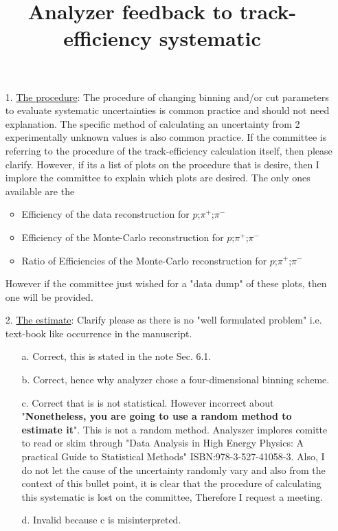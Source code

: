 \documentclass[10pt,a4paper]{report}
\author{}
\title{Analyzer feedback to track-efficiency systematic}
\date{}
\begin{document}
	\maketitle
\begin{itemize}
	\item[1.] \underline{The procedure}: The procedure of changing binning and/or cut parameters to evaluate systematic uncertainties is common practice and should not need explanation. The specific method of calculating an uncertainty from 2 experimentally unknown values is also common practice. If the committee is referring to the procedure of the track-efficiency calculation itself, then please clarify. However, if its a list of plots on the procedure that is desire, then I implore the committee to explain which plots are desired. The only ones available are the 
	\begin{itemize}
		\item Efficiency of the data reconstruction for $p$;$\pi^{+}$;$\pi^{-}$
		\item Efficiency of the Monte-Carlo reconstruction for $p$;$\pi^{+}$;$\pi^{-}$
		\item Ratio of Efficiencies of the Monte-Carlo reconstruction for $p$;$\pi^{+}$;$\pi^{-}$
	\end{itemize}
	However if the committee just wished for a "data dump" of these plots, then one will be provided.
	\item[2.] \underline{The estimate}: Clarify please as there is no "well formulated problem" i.e. text-book like occurrence in the manuscript.
	\begin{itemize}
		\item[a.] Correct, this is stated in the note Sec. 6.1.
		\item[b.] Correct, hence why analyzer chose a four-dimensional binning scheme.
		\item[c.] Correct that is is not statistical. However incorrect about "\textbf{Nonetheless, you are going to use a random method to estimate it}". This is not a random method. Analyszer implores comitte to read or skim through "Data Analysis in High Energy Physics: A practical Guide to Statistical Methods" ISBN:978-3-527-41058-3. Also, I do not let the cause of the uncertainty randomly vary and also from the context of this bullet point, it is clear that the procedure of calculating this systematic is lost on the committee, Therefore I request a meeting.
		\item[d.] Invalid because c is misinterpreted.
	\end{itemize}

\end{itemize}
\end{document}
